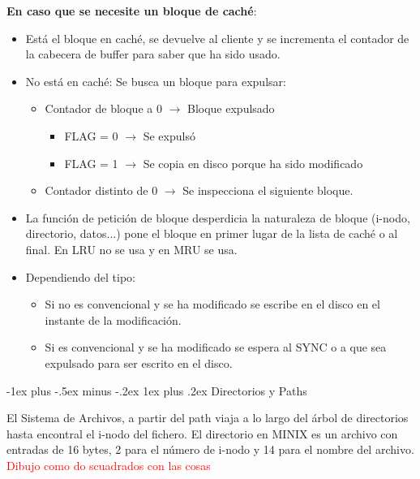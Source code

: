 \documentclass[10pt,portrait, twocolumn]{article}
\makeatletter
\renewcommand{\subsubsection}{\@startsection{subsubsection}{3}{0mm}%
                                {-1ex plus -.5ex minus -.2ex}%
                                {1ex plus .2ex}%
                                {\normalfont\small\bfseries}}
\makeatother
\begin{document}
\textbf{En caso que se necesite un bloque de caché}:

	\begin{itemize}
		\item Está el bloque en caché, se devuelve al cliente y se incrementa el contador de la cabecera de buffer para saber que ha sido usado.
		\item No está en caché: Se busca un bloque para expulsar:
			\begin{itemize}
				\item Contador de bloque a 0 $\rightarrow$ Bloque expulsado
					\begin{itemize}
						\item FLAG = 0 $\rightarrow$ Se expulsó
						\item FLAG = 1 $\rightarrow$ Se copia en disco porque ha sido modificado
					\end{itemize}
				\item Contador distinto de 0 $\rightarrow$ Se inspecciona el siguiente bloque.
			\end{itemize}
			\item La función de petición de bloque desperdicia la naturaleza de bloque (i-nodo, directorio, datos...) pone el bloque en primer lugar de la lista de caché o al final. En LRU no se usa y en MRU se usa.
			\item 	Dependiendo del tipo:
				\begin{itemize}
					\item Si no es convencional y se ha modificado se escribe en el disco en el instante de la modificación.
					\item Si es convencional y se ha modificado se espera al SYNC o a que sea expulsado para ser escrito en el disco.
				\end{itemize}
	\end{itemize}

\subsubsection{Directorios y Paths}

El Sistema de Archivos, a partir del path viaja a lo largo del árbol de directorios hasta encontral el i-nodo del fichero. El directorio en MINIX es un archivo con entradas de 16 bytes, 2 para el número de i-nodo y 14 para el nombre del archivo.\\

\textcolor{red}{Dibujo como do scuadrados con las cosas}\\
\end{document}
